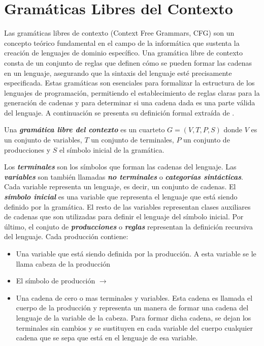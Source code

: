 \section{Gram\'aticas Libres del Contexto}\label{section:freecontenxtgrammar}

Las gramáticas libres de contexto (Context Free Grammars, CFG) son un concepto teórico 
fundamental en el campo de la informática que sustenta la creación de lenguajes de dominio específico. 
Una gramática libre de contexto consta de un conjunto de reglas que definen cómo se pueden 
formar las cadenas en un lenguaje, asegurando que la sintaxis del lenguaje esté precisamente especificada. 
Estas gramáticas son esenciales para formalizar la estructura de los lenguajes de programación, permitiendo 
el establecimiento de reglas claras para la generación de cadenas y para determinar si una cadena dada es 
una parte válida del lenguaje. A continuaci\'on se presenta su definici\'on formal 
extra\'ida de \cite{hopcroft_introduction_2007}.

\begin{definition}
    Una \textbf{\textit{gramática libre del contexto}} es un cuarteto $G=(V, T, P, S)$ donde $V$ es un 
    conjunto de variables, $T$ un conjunto de terminales, $P$ un conjunto de producciones y $S$ el símbolo 
    inicial de la gramática.
\end{definition}

Los \textbf{\textit{terminales}} son los símbolos que forman las cadenas del lenguaje. Las \textbf{\textit{variables}} 
son tambi\'en llamadas \textbf{\textit{no terminales}} o \textbf{\textit{categor\'ias sintácticas}}. Cada variable
representa un lenguaje, es decir, un conjunto de cadenas. El \textbf{\textit{símbolo inicial}} es una variable 
que representa el lenguaje que est\'a siendo definido por la gramática. El resto de las variables representan 
clases auxiliares de cadenas que son utilizadas para definir el lenguaje del símbolo inicial. Por \'ultimo, el 
conjuto de \textbf{\textit{producciones}} o \textbf{\textit{reglas}} representan la definici\'on recursiva 
del lenguaje. Cada producción contiene:

\begin{itemize}
    \item Una variable que est\'a siendo definida por la producción. A esta variable se le llama 
        cabeza de la producción
    \item El símbolo de producción $\rightarrow$ 
    \item Una cadena de cero o mas terminales y variables. Esta cadena es llamada el cuerpo de la 
        producción y representa un manera de formar una cadena del lenguaje de la variable de la cabeza. Para formar 
        dicha cadena, se dejan los terminales sin cambios y se sustituyen en cada variable del cuerpo cualquier 
        cadena que se sepa que está en el lenguaje de esa variable.
\end{itemize}